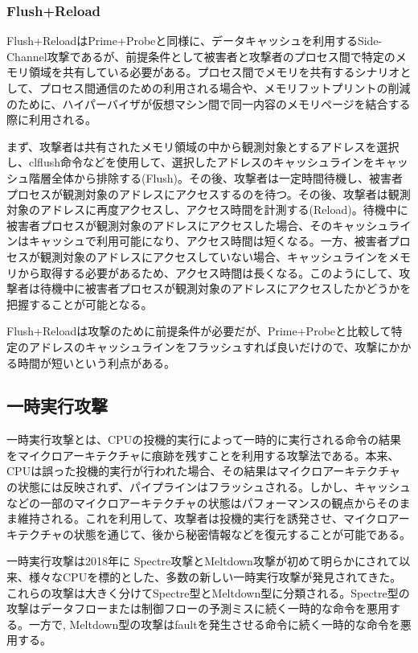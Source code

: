\subsubsection{Flush+Reload}
Flush+ReloadはPrime+Probeと同様に、データキャッシュを利用するSide-Channel攻撃であるが、前提条件として被害者と攻撃者のプロセス間で特定のメモリ領域を共有している必要がある。プロセス間でメモリを共有するシナリオとして、プロセス間通信のための利用される場合や、メモリフットプリントの削減のために、ハイパーバイザが仮想マシン間で同一内容のメモリページを結合する際に利用される\cite{yarom2014flush+}。\par
まず、攻撃者は共有されたメモリ領域の中から観測対象とするアドレスを選択し、clflush命令などを使用して、選択したアドレスのキャッシュラインをキャッシュ階層全体から排除する(Flush)。その後、攻撃者は一定時間待機し、被害者プロセスが観測対象のアドレスにアクセスするのを待つ。その後、攻撃者は観測対象のアドレスに再度アクセスし、アクセス時間を計測する(Reload)。待機中に被害者プロセスが観測対象のアドレスにアクセスした場合、そのキャッシュラインはキャッシュで利用可能になり、アクセス時間は短くなる。一方、被害者プロセスが観測対象のアドレスにアクセスしていない場合、キャッシュラインをメモリから取得する必要があるため、アクセス時間は長くなる。このようにして、攻撃者は待機中に被害者プロセスが観測対象のアドレスにアクセスしたかどうかを把握することが可能となる。\par
Flush+Reloadは攻撃のために前提条件が必要だが、Prime+Probeと比較して特定のアドレスのキャッシュラインをフラッシュすれば良いだけので、攻撃にかかる時間が短いという利点がある。

\subsection{一時実行攻撃}
一時実行攻撃とは、CPUの投機的実行によって一時的に実行される命令の結果をマイクロアーキテクチャに痕跡を残すことを利用する攻撃法である。本来、CPUは誤った投機的実行が行われた場合、その結果はマイクロアーキテクチャの状態には反映されず、パイプラインはフラッシュされる。しかし、キャッシュなどの一部のマイクロアーキテクチャの状態はパフォーマンスの観点からそのまま維持される。これを利用して、攻撃者は投機的実行を誘発させ、マイクロアーキテクチャの状態を通じて、後から秘密情報などを復元することが可能である。\par

一時実行攻撃は2018年に Spectre攻撃\cite{8835233}とMeltdown攻撃\cite{217478}が初めて明らかにされて以来、様々なCPUを標的とした、多数の新しい一時実行攻撃が発見されてきた。これらの攻撃は大きく分けてSpectre型とMeltdown型に分類される\cite{canella2019systematic}。Spectre型の攻撃\cite{8835233,220586,10.1145/3243734.3243761,horn2018speculative}はデータフローまたは制御フローの予測ミスに続く一時的な命令を悪用する。一方で, Meltdown型の攻撃\cite{217478,van2018foreshadow, stecklina2018lazyfp,van2019ridl,van2020lvi}はfaultを発生させる命令に続く一時的な命令を悪用する。\par

